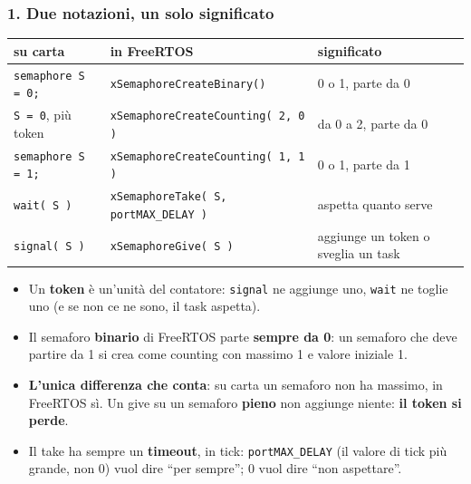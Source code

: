 \subsubsection*{1. Due notazioni, un solo significato}
\begin{center}
\footnotesize
\begin{tabular}{P{0.2} P{0.45} P{0.25}}
    \hline
    \textbf{su carta} & \textbf{in FreeRTOS} & \textbf{significato} \\
    \hline
    \texttt{semaphore S = 0;} & \texttt{xSemaphoreCreateBinary()} & 0 o 1, parte da 0 \\
    \texttt{S = 0}, più token & \texttt{xSemaphoreCreateCounting( 2, 0 )} & da 0 a 2, parte da 0 \\
    \texttt{semaphore S = 1;} & \texttt{xSemaphoreCreateCounting( 1, 1 )} & 0 o 1, parte da 1 \\
    \texttt{wait( S )} & \texttt{xSemaphoreTake( S, portMAX\_DELAY )} & aspetta quanto serve \\
    \texttt{signal( S )} & \texttt{xSemaphoreGive( S )} & aggiunge un token o sveglia un task \\
    \hline
\end{tabular}
\end{center}
\begin{itemize}
    \item Un \textbf{token} è un'unità del contatore: \texttt{signal} ne aggiunge uno, \texttt{wait} ne toglie uno (e se non ce ne sono, il task aspetta).
    \item Il semaforo \textbf{binario} di FreeRTOS parte \textbf{sempre da 0}: un semaforo che deve partire da 1 si crea come counting con massimo 1 e valore iniziale 1.
    \item \textbf{L'unica differenza che conta}: su carta un semaforo non ha massimo, in FreeRTOS sì. Un give su un semaforo \textbf{pieno} non aggiunge niente: \textbf{il token si perde}.
    \item Il take ha sempre un \textbf{timeout}, in tick: \texttt{portMAX\_DELAY} (il valore di tick più grande, non 0) vuol dire ``per sempre''; 0 vuol dire ``non aspettare''.
\end{itemize}

